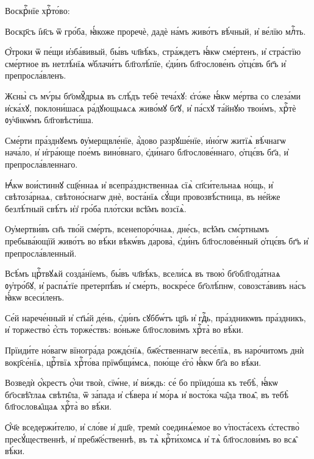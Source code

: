  Воскрⷭ҇нїе хрⷭ҇то́во:   

\hKv Воскр҃съ і҆и҃съ ѿ гро́ба, ꙗ҆́коже проречѐ, дадѐ на́мъ  живо́тъ вѣ́чный, и҆ ве́лїю млⷭ҇ть.  
%

\hKv Ѻ҆́троки ѿ пе́щи и҆зба́вивый, бы́въ чл҃вѣ́къ,  стра́ждетъ ꙗ҆́кѡ сме́ртенъ, и҆ стра́стїю сме́ртное въ  нетлѣ́нїѧ ѡ҆блачи́тъ бл҃голѣ́пїе, є҆ди́нъ бл҃гослове́нъ  ѻ҆тцє́въ бг҃ъ и҆ препросла́вленъ. 

\hKv Жєны̀ съ мѵ́ры бг҃омꙋ̑дрыѧ въ слѣ́дъ тебѐ теча́хꙋ:  є҆го́же ꙗ҆́кѡ ме́ртва со слеза́ми и҆ска́хꙋ, поклони́шасѧ  ра́дꙋющыѧсѧ живо́мꙋ бг҃ꙋ, и҆ па́схꙋ та́йнꙋю твои́мъ, хрⷭ҇тѐ  ᲂу҆ч҃нкѡ́мъ бл҃говѣсти́ша. 

\hKv Сме́рти пра́зднꙋемъ ᲂу҆мерщвле́нїе, а҆́дово разрꙋше́нїе,  и҆но́гѡ житїѧ̀ вѣ́чнагѡ нача́ло, и҆ и҆гра́юще пое́мъ  вино́внаго, є҆ди́наго бл҃гослове́ннаго, ѻ҆тцє́въ бг҃а, и҆  препросла́вленнаго. 

\hKv Ꙗ҆́кѡ вои́стиннꙋ сщ҃е́ннаѧ и҆ всепра́зднственнаѧ сїѧ̀  сп҃си́тельнаѧ но́щь, и҆ свѣтоза́рнаѧ, свѣтоно́снагѡ днѐ,  воста́нїѧ сꙋ́щи   провозвѣ́стница, въ не́йже безлѣ́тный свѣ́тъ и҆з̾ гро́ба  пло́тски всѣ̑мъ возсїѧ̀. 

\hKv  Оу҆мертви́въ сн҃ъ тво́й сме́рть, всенепоро́чнаѧ,  дне́сь, всѣ̑мъ смє́ртнымъ пребыва́ющїй живо́тъ во вѣ́ки  вѣкѡ́въ дарова̀, є҆ди́нъ бл҃гослове́нный ѻ҆тцє́въ бг҃ъ  и҆ препросла́вленный.  

\hKv  Всѣ́мъ црⷭ҇твꙋѧй созда́нїемъ, бы́въ чл҃вѣ́къ,  всели́сѧ въ твою̀ бг҃обл҃года́тнаѧ ᲂу҆тро́бꙋ, и҆ распѧ́тїе  претерпѣ́въ и҆ сме́рть, воскре́се бг҃олѣ́пнѡ,  совозста́вивъ на́съ ꙗ҆́кѡ всеси́ленъ. 


\hKv Се́й нарече́нный и҆ ст҃ы́й де́нь, є҆ди́нъ  сꙋббѡ́тъ цр҃ь и҆ гдⷭ҇ь, пра́здникѡвъ пра́здникъ, и҆  торжество̀ є҆́сть торже́ствъ: во́ньже бл҃гослови́мъ хрⷭ҇та̀  во вѣ́ки. 

\hKv Прїиди́те но́вагѡ вїногра́да рождє́нїѧ, бж҃е́ственнагѡ  весе́лїѧ, въ наро́читомъ днѝ вокр҃се́нїѧ, црⷭ҇твїѧ  хрⷭ҇то́ва прїѡбщи́мсѧ, пою́ще є҆го̀ ꙗ҆́кѡ бг҃а во вѣ́ки.   

\hKv Возведѝ ѻ҆́крестъ ѻ҆́чи твоѝ, сїѡ́не, и҆ ви́ждь: се́ бо  прїидо́ша къ тебѣ̀, ꙗ҆́кѡ бг҃освѣ̑тлаѧ свѣти̑ла, ѿ  за́пада и҆ сѣ́вера и҆ мо́рѧ и҆ восто́ка ча̑да твоѧ̑, въ  тебѣ̀ бл҃гословѧ̑щаѧ хрⷭ҇та̀ во вѣ́ки. 
%

\hKv Ѻ҆́ч҃е вседержи́телю, и҆ сло́ве и҆ дш҃е, тремѝ  соединѧ́емое во ѵ҆поста́сехъ є҆стество̀ пресꙋ́щественнѣ,  и҆ пребж҃е́ственнѣ, въ тѧ̀ крⷭ҇ти́хомсѧ и҆ тѧ̀  бл҃гослови́мъ во всѧ̑ вѣ́ки.  

